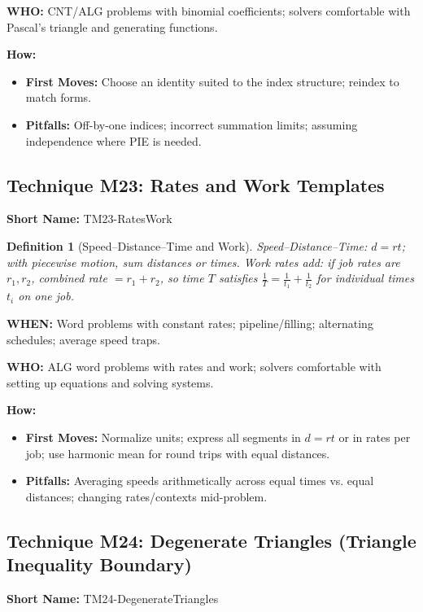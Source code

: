 \documentclass[12pt]{article}
\newtheorem{definition}{Definition}[section]
\begin{document}
\textbf{WHO:} CNT/ALG problems with binomial coefficients; solvers comfortable with Pascal's triangle and generating functions.

\textbf{How:}
\begin{itemize}
    \item \textbf{First Moves:} Choose an identity suited to the index structure; reindex to match forms.
    \item \textbf{Pitfalls:} Off-by-one indices; incorrect summation limits; assuming independence where PIE is needed.
\end{itemize}


\subsection{Technique M23: Rates and Work Templates}
\textbf{Short Name:} TM23-RatesWork

\begin{definition}[Speed–Distance–Time and Work]
Speed–Distance–Time: $d=rt$; with piecewise motion, sum distances or times. Work rates add: if job rates are $r_1, r_2$, combined rate $=r_1+r_2$, so time $T$ satisfies $\tfrac{1}{T}=\tfrac{1}{t_1}+\tfrac{1}{t_2}$ for individual times $t_i$ on one job.
\end{definition}

\textbf{WHEN:} Word problems with constant rates; pipeline/filling; alternating schedules; average speed traps.

\textbf{WHO:} ALG word problems with rates and work; solvers comfortable with setting up equations and solving systems.

\textbf{How:}
\begin{itemize}
    \item \textbf{First Moves:} Normalize units; express all segments in $d=rt$ or in rates per job; use harmonic mean for round trips with equal distances.
    \item \textbf{Pitfalls:} Averaging speeds arithmetically across equal times vs. equal distances; changing rates/contexts mid-problem.
\end{itemize}

\subsection{Technique M24: Degenerate Triangles (Triangle Inequality Boundary)}
\textbf{Short Name:} TM24-DegenerateTriangles
\end{document}

